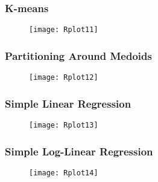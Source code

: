 \documentclass[border=5mm, convert, usenames, dvipsnames,beamer]{standalone}
\begin{document}
\begin{frame}[ fragile]{}
\frametitle{K-means}

\vspace{40}
\noindent

\vspace{0mm}
\begin{figure}[h!]
\begin{center}
\texttt{[image: Rplot11]}
\end{center}
\end{figure}




\end{frame}




\begin{frame}[ fragile]{}
\frametitle{Partitioning Around Medoids}

\vspace{40}
\noindent

\vspace{0mm}
\begin{figure}[h!]
\begin{center}
\texttt{[image: Rplot12]}
\end{center}
\end{figure}




\end{frame}






\begin{frame}[ fragile]{}
\frametitle{Simple Linear Regression}

\vspace{40}
\noindent

\vspace{0mm}
\begin{figure}[h!]
\begin{center}
\texttt{[image: Rplot13]}
\end{center}
\end{figure}




\end{frame}







\begin{frame}[ fragile]{}
\frametitle{Simple Log-Linear Regression}

\vspace{40}
\noindent

\vspace{0mm}
\begin{figure}[h!]
\begin{center}
\texttt{[image: Rplot14]}
\end{center}
\end{figure}




\end{frame}
\end{document}
